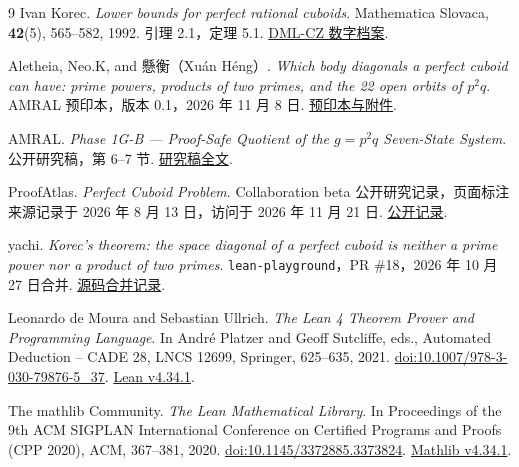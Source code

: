 \documentclass[11pt,a4paper,twoside]{article}
\numberwithin{equation}{section}
\begin{document}
\begin{thebibliography}{9}
 Ivan Korec. \emph{Lower bounds for perfect rational cuboids}. Mathematica Slovaca, \textbf{42}(5), 565–582, 1992. 引理 2.1，定理 5.1. \href{https://dml.cz/handle/10338.dmlcz/132903}{DML-CZ 数字档案}.

 Aletheia, Neo.K, and 懸衡（Xuán Héng）. \emph{Which body diagonals a perfect cuboid can have: prime powers, products of two primes, and the 22 open orbits of \(p^2q\)}. AMRAL 预印本，版本 0.1，2026 年 11 月 8 日. \href{https://amral.evemisslab.com/en/perfect-cuboid/papers/body-diagonal-factorization/}{预印本与附件}.

 AMRAL. \emph{Phase 1G-B — Proof-Safe Quotient of the \(g=p^2q\) Seven-State System}. 公开研究稿，第 6–7 节. \href{https://amral.evemisslab.com/en/perfect-cuboid/files/phase1g_b_p2q_four_class_reduction.md}{研究稿全文}.

 ProofAtlas. \emph{Perfect Cuboid Problem}. Collaboration beta 公开研究记录，页面标注来源记录于 2026 年 8 月 13 日，访问于 2026 年 11 月 21 日. \href{https://www.proofatlas.ai/collaboration/perfect-cuboid-problem/}{公开记录}.

 yachi. \emph{Korec's theorem: the space diagonal of a perfect cuboid is neither a prime power nor a product of two primes}. \texttt{lean-playground}，PR \#18，2026 年 10 月 27 日合并. \href{https://github.com/yachi/lean-playground/pull/18}{源码合并记录}.

 Leonardo de Moura and Sebastian Ullrich. \emph{The Lean 4 Theorem Prover and Programming Language}. In André Platzer and Geoff Sutcliffe, eds., Automated Deduction – CADE 28, LNCS 12699, Springer, 625–635, 2021. \href{https://doi.org/10.1007/978-3-030-79876-5_37}{doi:10.1007/978-3-030-79876-5\_37}. \href{https://github.com/leanprover/lean4/releases/tag/v4.34.1}{Lean v4.34.1}.

 The mathlib Community. \emph{The Lean Mathematical Library}. In Proceedings of the 9th ACM SIGPLAN International Conference on Certified Programs and Proofs (CPP 2020), ACM, 367–381, 2020. \href{https://doi.org/10.1145/3372885.3373824}{doi:10.1145/3372885.3373824}. \href{https://github.com/leanprover-community/mathlib4/releases/tag/v4.34.1}{Mathlib v4.34.1}.
\end{thebibliography}
\end{document}
